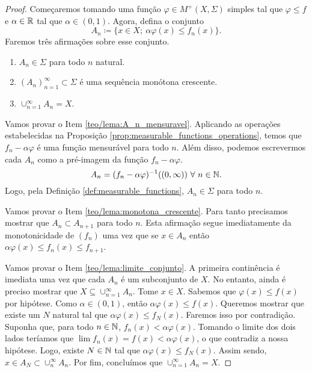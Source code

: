 \begin{proof}
    Começaremos tomando uma função $\varphi\in M^{+}(X,\Sigma)$ simples tal que $\varphi\leq f$ e $\alpha\in\mathbb{R}$ tal que $\alpha\in (0,1)$. Agora, defina o conjunto
    \begin{equation}
        A_n\coloneqq \{x\in X; \ \alpha\varphi(x)\leq f_n(x)\}.
    \end{equation}
    Faremos três afirmações sobre esse conjunto.
    \begin{enumerate}
        \item $A_n\in\Sigma$ para todo $n$ natural.\label{teo/lema:A_n_mensuravel}
        \item $(A_n)_{n=1}^{\infty}\subset \Sigma$ é uma sequência monótona crescente.\label{teo/lema:monotona_crescente}
        \item $\cup_{n=1}^{\infty}A_n=X$.\label{teo/lema:limite_conjunto}
    \end{enumerate}
    
    Vamos provar o Item \ref{teo/lema:A_n_mensuravel}. Aplicando as operações estabelecidas na Proposição \ref{prop:measurable_functions_operations}, temos que $f_n-\alpha\varphi$ é uma função mensurável para todo $n$. Além disso, podemos escrevermos cada $A_n$ como a pré-imagem da função $f_n-\alpha\varphi$.
    \begin{equation*}
        A_n=(f_n-\alpha\varphi)^{-1}((0,\infty)) \ \forall \ n\in\N.
    \end{equation*}
    Logo, pela Definição \ref{def:measurable_functions}, $A_n\in \Sigma$ para todo $n$.
    
    Vamos provar o Item \ref{teo/lema:monotona_crescente}. Para tanto precisamos mostrar que $A_n\subset A_{n+1}$ para todo $n$. Esta afirmação segue imediatamente da monotonicidade de $(f_n)$ uma vez que se $x\in A_n$ então $\alpha\varphi(x)\leq f_n(x)\leq f_{n+1}$.

    Vamos provar o Item \ref{teo/lema:limite_conjunto}. A primeira continência é imediata uma vez que cada $A_n$ é um subconjunto de $X$. No entanto, ainda é preciso mostrar que $X\subseteq \cup_{n=1}^{\infty} A_n$. Tome $x\in X$. Sabemos que $\varphi (x) \leq f(x)$ por hipótese. Como $\alpha\in (0,1)$, então $\alpha\varphi(x)\leq f(x)$. Queremos mostrar que existe um $N$ natural tal que $\alpha \varphi(x) \leq f_N(x)$. Faremos isso por contradição. Suponha que, para todo $n\in\mathbb{N}$, $f_n(x)<\alpha\varphi(x)$. Tomando o limite dos dois lados teríamos que $\lim f_n(x) = f(x) < \alpha \varphi(x)$, o que contradiz a nossa hipótese. Logo, existe $N\in\mathbb{N}$ tal que $\alpha \varphi(x) \leq f_N(x)$. Assim sendo, $x\in A_N \subset \cup_{n}^{\infty} A_n$. Por fim, concluímos que $\cup_{n=1}^{\infty}A_n=X$.


\end{proof}
